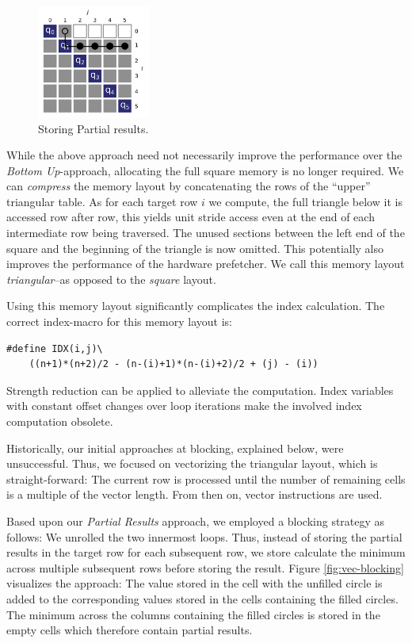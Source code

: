 \begin{figure}[htb]\centering
	\includegraphics[width=0.33\textwidth]{img/intermediate_access.png}
  \caption{Storing Partial results.\label{fig:partial}}
\end{figure}

 While the above approach need not necessarily improve
the performance over the \emph{Bottom Up}-approach, allocating the full
square memory is no longer required. We can \emph{compress} the memory
layout by concatenating the rows of the ``upper'' triangular table.  As for
each target row $i$ we compute, the full triangle below it is accessed row
after row, this yields unit stride access even at the end of each
intermediate row being traversed. The unused sections between the left end
of the square and the beginning of the triangle is now omitted. This
potentially also improves the performance of the hardware prefetcher. We
call this memory layout \emph{triangular}--as opposed to the \emph{square}
layout.

Using this memory layout significantly complicates the index calculation.
The correct index-macro for this memory layout is:
\begin{center}
	\scriptsize
	\begin{verbatim}#define IDX(i,j)\
	((n+1)*(n+2)/2 - (n-(i)+1)*(n-(i)+2)/2 + (j) - (i))\end{verbatim}
\end{center}
Strength reduction can be applied to alleviate the computation. Index
variables with constant offset changes over loop iterations make the
involved index computation obsolete.

 Historically, our initial approaches at
blocking, explained below, were unsuccessful. Thus, we focused on
vectorizing the triangular layout, which is straight-forward: The current
row is processed until the number of remaining cells is a multiple of the
vector length. From then on, vector instructions are used.

 Based upon our \emph{Partial Results} approach, we employed a
blocking strategy as follows: We unrolled the two innermost loops.
Thus, instead of storing the partial results in the target row for each
subsequent row, we store calculate the minimum across multiple subsequent rows
before storing the result.
Figure \ref{fig:vec-blocking} visualizes the approach: The value stored in the
cell with the unfilled circle is added to the corresponding values stored in the
cells containing the filled circles. The minimum across the columns containing
the filled circles is stored in the empty cells which therefore contain partial
results.

